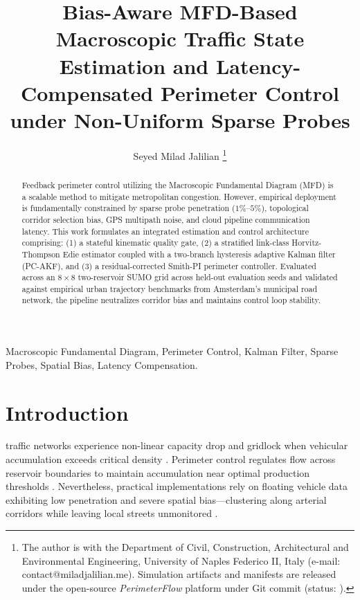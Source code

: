 \documentclass[lettersize,journal]{IEEEtran}
\begin{document}
\title{Bias-Aware MFD-Based Macroscopic Traffic State Estimation and Latency-Compensated Perimeter Control under Non-Uniform Sparse Probes}

\author{Seyed Milad Jalilian
\thanks{The author is with the Department of Civil, Construction, Architectural and Environmental Engineering, University of Naples Federico II, Italy (e-mail: contact@miladjalilian.me). Simulation artifacts and manifests are released under the open-source \textit{PerimeterFlow} platform under Git commit \texttt{\ArtifactGitSHA} (status: \texttt{\ArtifactStatus}).}}


\maketitle

\begin{abstract}
Feedback perimeter control utilizing the Macroscopic Fundamental Diagram (MFD) is a scalable method to mitigate metropolitan congestion. However, empirical deployment is fundamentally constrained by sparse probe penetration ($1\%$--$5\%$), topological corridor selection bias, GPS multipath noise, and cloud pipeline communication latency. This work formulates an integrated estimation and control architecture comprising: (1) a stateful kinematic quality gate, (2) a stratified link-class Horvitz-Thompson Edie estimator coupled with a two-branch hysteresis adaptive Kalman filter (PC-AKF), and (3) a residual-corrected Smith-PI perimeter controller. Evaluated across an $8\times 8$ two-reservoir SUMO grid across \EvalSeedCount{} held-out evaluation seeds and validated against empirical urban trajectory benchmarks from Amsterdam's municipal road network, the pipeline neutralizes corridor bias and maintains control loop stability.
\end{abstract}

\begin{IEEEkeywords}
Macroscopic Fundamental Diagram, Perimeter Control, Kalman Filter, Sparse Probes, Spatial Bias, Latency Compensation.
\end{IEEEkeywords}

\section{Introduction}
 traffic networks experience non-linear capacity drop and gridlock when vehicular accumulation exceeds critical density \cite{geroliminis2008existence}. Perimeter control regulates flow across reservoir boundaries to maintain accumulation near optimal production thresholds \cite{keyvan2012exploiting}. Nevertheless, practical implementations rely on floating vehicle data exhibiting low penetration and severe spatial bias—clustering along arterial corridors while leaving local streets unmonitored \cite{ambuhl2016data}.
\end{document}
